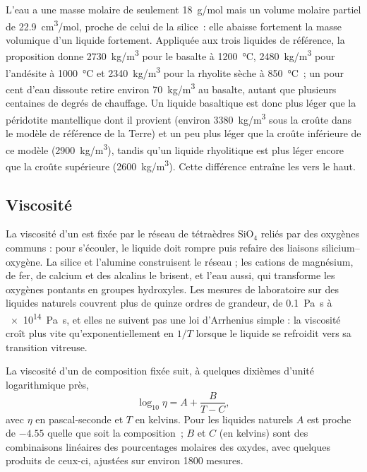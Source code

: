 L'eau a une masse molaire de seulement \qty{18}{g/mol} mais un volume molaire partiel de
\qty{22.9}{cm^3/mol}, proche de celui de la silice~: elle abaisse fortement la masse volumique d'un liquide
fortement. Appliquée aux trois liquides de référence, la proposition donne
\qty{2730}{kg/m^3} pour le basalte à \qty{1200}{\celsius}, \qty{2480}{kg/m^3} pour
l'andésite à \qty{1000}{\celsius} et \qty{2340}{kg/m^3} pour la rhyolite sèche
à \qty{850}{\celsius}~; un pour cent d'eau dissoute retire environ
\qty{70}{kg/m^3} au basalte, autant que plusieurs centaines de degrés de chauffage.
Un liquide basaltique est donc plus léger que la péridotite mantellique dont il provient
(environ \qty{3380}{kg/m^3} sous la croûte dans le modèle de référence de la Terre) et un peu
plus léger que la croûte inférieure de ce modèle (\qty{2900}{kg/m^3}), tandis qu'un
liquide rhyolitique est plus léger encore que la croûte supérieure (\qty{2600}{kg/m^3}). Cette différence entraîne les 
vers le haut.

\subsection{Viscosité}

La viscosité d'un  est fixée par le réseau de tétraèdres SiO$_4$
reliés par des oxygènes communs : pour s'écouler, le liquide doit rompre puis refaire
des liaisons silicium--oxygène. La silice et l'alumine construisent le réseau ; les cations
de magnésium, de fer, de calcium et des alcalins le brisent, et l'eau aussi, qui
transforme les oxygènes pontants en groupes hydroxyles. Les mesures de laboratoire sur des
liquides naturels couvrent plus de quinze ordres de grandeur, de \qty{0.1}{Pa.s} à
\qty{e14}{Pa.s}, et elles ne suivent pas une loi d'Arrhenius simple : la viscosité
croît plus vite qu'exponentiellement en $1/T$ lorsque le liquide se refroidit vers sa transition
vitreuse.

\begin{proposition}\label{prop:b2:magma-emplacement:vft}
La viscosité d'un  de composition fixée suit, à quelques
dixièmes d'unité logarithmique près,
\[
\log_{10}\eta = A + \frac{B}{T - C},
\]
avec $\eta$ en pascal-seconde et $T$ en kelvins. Pour les liquides naturels $A$ est proche
de $-4.55$ quelle que soit la composition~; $B$ et $C$ (en kelvins) sont des combinaisons linéaires
des pourcentages molaires des oxydes, avec quelques produits de ceux-ci,
ajustées sur environ \num{1800} mesures.
\end{proposition}
\admitted

